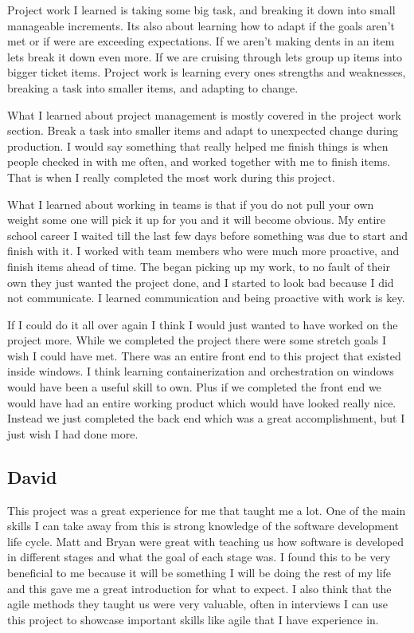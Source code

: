 \documentclass[onecolumn, draftclsnofoot,10pt, compsoc]{IEEEtran}
\begin{document}
Project work I learned is taking some big task, and breaking it down into small manageable increments. Its also about learning how to adapt if the goals aren't met or if were are exceeding expectations. If we aren't making dents in an item lets break it down even more. If we are cruising through lets group up items into bigger ticket items. Project work is learning every ones strengths and weaknesses, breaking a task into smaller items, and adapting to change.

What I learned about project management is mostly covered in the project work section. Break a task into smaller items and adapt to unexpected change during production. I would say something that really helped me finish things is when people checked in with me often, and worked together with me to finish items. That is when I really completed the most work during this project.

What I learned about working in teams is that if you do not pull your own weight some one will pick it up for you and it will become obvious. My entire school career I waited till the last few days before something was due to start and finish with it. I worked with team members who were much more proactive, and finish items ahead of time. The began picking up my work, to no fault of their own they just wanted the project done, and I started to look bad because I did not communicate. I learned communication and being proactive with work is key.

If I could do it all over again I think I would just wanted to have worked on the project more. While we completed the project there were some stretch goals I wish I could have met. There was an entire front end to this project that existed inside windows. I think learning containerization and orchestration on windows would have been a useful skill to own. Plus if we completed the front end we would have had an entire working product which would have looked really nice. Instead we just completed the back end which was a great accomplishment, but I just wish I had done more.



\subsection{David}
This project was a great experience for me that taught me a lot. One of the main skills I can take away from this is strong knowledge of the software development life cycle. Matt and Bryan were great with teaching us how software is developed in different stages and what the goal of each stage was. I found this to be very beneficial to me because it will be something I will be doing the rest of my life and this gave me a great introduction for what to expect. I also think that the agile methods they taught us were very valuable, often in interviews I can use this project to showcase important skills like agile that I have experience in. 
\end{document}

